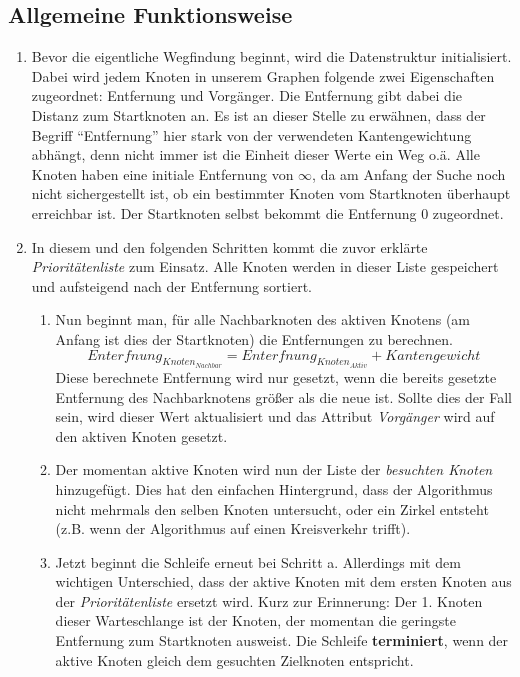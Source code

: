 \documentclass[11pt]{scrreprt}
\begin{document}
		\subsection{Allgemeine Funktionsweise}
		\begin{enumerate}
			\item Bevor die eigentliche Wegfindung beginnt, wird die Datenstruktur initialisiert. Dabei wird jedem Knoten in unserem Graphen folgende zwei Eigenschaften zugeordnet: Entfernung und Vorgänger. Die Entfernung gibt dabei die Distanz zum Startknoten an. Es ist an dieser Stelle zu erwähnen, dass der Begriff \enquote{Entfernung} hier stark von der verwendeten Kantengewichtung abhängt, denn nicht immer ist die Einheit dieser Werte ein Weg o.ä.
			Alle Knoten haben eine initiale Entfernung von $\infty$, da am Anfang der Suche noch nicht sichergestellt ist, ob ein bestimmter Knoten vom Startknoten überhaupt erreichbar ist.
			Der Startknoten selbst bekommt die Entfernung 0 zugeordnet. \cite{wiki:german:dijkstra}
			
			\item In diesem und den folgenden Schritten kommt die zuvor erklärte \textit{Prioritätenliste} zum Einsatz. Alle Knoten werden in dieser Liste gespeichert und aufsteigend nach der Entfernung sortiert.
			
			\begin{enumerate} 
				\item Nun beginnt man, für alle Nachbarknoten des aktiven Knotens (am Anfang ist dies der Startknoten) die Entfernungen zu berechnen. 
				\begin{equation*}
					Enterfnung_{Knoten_{Nachbar}} = Enterfnung_{Knoten_{Aktiv}} + Kantengewicht
				\end{equation*}
				Diese berechnete Entfernung wird nur gesetzt, wenn die bereits gesetzte Entfernung des Nachbarknotens größer als die neue ist. Sollte dies der Fall sein, wird dieser Wert aktualisiert und das Attribut \textit{Vorgänger} wird auf den aktiven Knoten gesetzt.
				\cite{wiki:german:dijkstra}
				\item Der momentan aktive Knoten wird nun der Liste der \textit{besuchten Knoten} hinzugefügt. Dies hat den einfachen Hintergrund, dass der Algorithmus nicht mehrmals den selben Knoten untersucht, oder ein Zirkel entsteht (z.B. wenn der Algorithmus auf einen Kreisverkehr trifft).
				\item Jetzt beginnt die Schleife erneut bei Schritt a. Allerdings mit dem wichtigen Unterschied, dass der aktive Knoten mit dem ersten Knoten aus der \textit{Prioritätenliste} ersetzt wird. \cite{wiki:german:dijkstra} Kurz zur Erinnerung: Der 1. Knoten dieser Warteschlange ist der Knoten, der momentan die geringste Entfernung zum Startknoten ausweist. Die Schleife \textbf{terminiert}, wenn der aktive Knoten gleich dem gesuchten Zielknoten entspricht.
			\end{enumerate}
			
		\end{enumerate}
	
\end{document}
